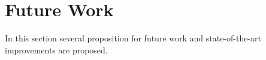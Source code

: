 \section{Future Work} \label{future_work}
In this section several proposition for future work and state-of-the-art improvements are proposed.
